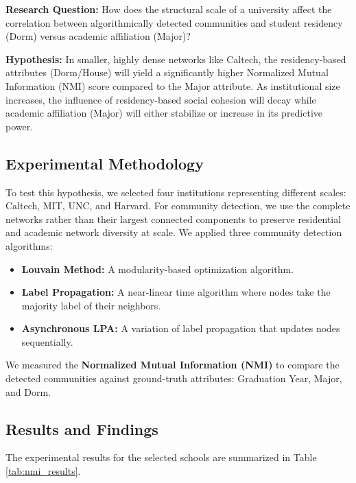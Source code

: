 \documentclass[12pt]{article}
\begin{document}
\textbf{Research Question:} How does the structural scale of a university affect the correlation between algorithmically detected communities and student residency (Dorm) versus academic affiliation (Major)?

\textbf{Hypothesis:} In smaller, highly dense networks like Caltech, the residency-based attributes (Dorm/House) will yield a significantly higher Normalized Mutual Information (NMI) score compared to the Major attribute. As institutional size increases, the influence of residency-based social cohesion will decay while academic affiliation (Major) will either stabilize or increase in its predictive power.

\subsection*{Experimental Methodology}

To test this hypothesis, we selected four institutions representing different scales: Caltech, MIT, UNC, and Harvard. For community detection, we use the complete networks rather than their largest connected components to preserve residential and academic network diversity at scale. We applied three community detection algorithms:
\begin{itemize}
    \item \textbf{Louvain Method:} A modularity-based optimization algorithm.
    \item \textbf{Label Propagation:} A near-linear time algorithm where nodes take the majority label of their neighbors.
    \item \textbf{Asynchronous LPA:} A variation of label propagation that updates nodes sequentially.
\end{itemize}

We measured the \textbf{Normalized Mutual Information (NMI)} to compare the detected communities against ground-truth attributes: Graduation Year, Major, and Dorm.

\subsection*{Results and Findings}

The experimental results for the selected schools are summarized in Table \ref{tab:nmi_results}.
\end{document}
